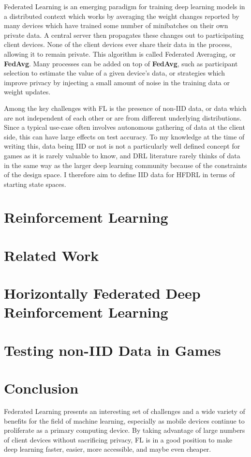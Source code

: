 \documentclass[10pt,journal,compsoc]{IEEEtran}
\begin{document}
Federated Learning is an emerging paradigm for training deep learning models in a distributed context
which works by averaging the weight changes reported by many devices which have trained some number
of minibatches on their own private data. A central server then propagates these changes out to
participating client devices. None of the client devices ever share their data in the process, allowing
it to remain private\cite{CITE_TODO mcmahan}. This algorithm is called Federated Averaging, or \textbf{FedAvg}.
Many processes can be added on top of \textbf{FedAvg}, such as participant selection to estimate the
value of a given device's data\cite{TODO Oort}, or strategies which improve privacy by injecting a small
amount of noise in the training data or weight updates\cite{TODO DP NOISE}.

Among the key challenges with FL is the presence of non-IID data, or data which are not independent of
each other or are from different underlying distributions. Since a typical use-case often involves autonomous
gathering of data at the client side, this can have large effects on test accuracy. To my knowledge at the time
of writing this, data being IID or not is not a particularly well defined concept for games as it is rarely
valuable to know, and DRL literature rarely thinks of data in the same way as the larger deep learning community
because of the constraints of the design space. I therefore aim to define IID data for HFDRL in terms of starting
state spaces.

\section{Reinforcement Learning}

\section{Related Work}

\section{Horizontally Federated Deep Reinforcement Learning}

\section{Testing non-IID Data in Games}

\section{Conclusion}
Federated Learning presents an interesting set of challenges and a wide variety of benefits for the field
of machine learning, especially as mobile devices continue to proliferate as a primary computing device.
By taking advantage of large numbers of client devices without sacrificing privacy, FL is in a good position
to make deep learning faster, easier, more accessible, and maybe even cheaper.

\ifCLASSOPTIONcaptionsoff
    \newpage
\fi

% 
\end{document}
